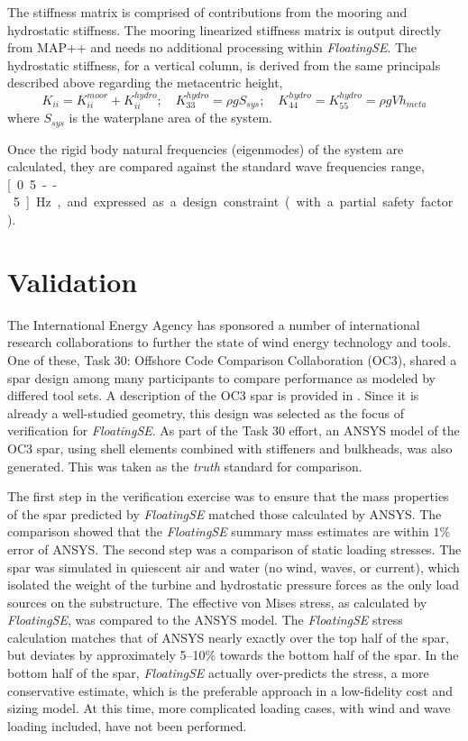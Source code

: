 The stiffness matrix is comprised of contributions from the mooring
and hydrostatic stiffness.  The mooring linearized stiffness matrix is output
directly from MAP++ and needs no additional processing within
\textit{FloatingSE}.  The hydrostatic stiffness, for a vertical column, is derived from the same
principals described above regarding the metacentric height,
\begin{equation}
  K_{ii} = K_{ii}^{moor} + K_{ii}^{hydro};\quad K_{33}^{hydro} = \rho g
  S_{sys};\quad K_{44}^{hydro} =  K_{55}^{hydro} = \rho g V h_{meta}
\end{equation}
where $S_{sys}$ is the waterplane area of the system.

Once the rigid body natural frequencies (eigenmodes) of the system are
calculated, they are compared against the standard wave frequencies
range, \unit[0.5--5]{Hz}, and expressed as a design constraint (with a
partial safety factor).


\section{Validation}
The International Energy Agency has sponsored a number of international
research collaborations to further the state of wind energy technology and
tools.  One of these, Task 30: Offshore Code Comparison Collaboration
(OC3), shared a spar design among many participants to compare
performance as modeled by differed tool sets.  A description of the OC3
spar is provided in \citet{OC3}.  Since it is already a
well-studied geometry, this design was selected as the focus of
verification for \textit{FloatingSE}.  As part of the Task 30 effort,
an ANSYS model of the OC3 spar, using shell elements combined with
stiffeners and bulkheads, was also generated.  This was taken as
the \textit{truth} standard for comparison.

The first step in the verification exercise was to ensure that the mass
properties of the spar predicted by \textit{FloatingSE} matched those
calculated by ANSYS.  The comparison showed that the \textit{FloatingSE}
summary mass estimates are within $1\%$ error of ANSYS.  The second step
was a comparison of static loading stresses.  The spar was simulated in
quiescent air and water (no wind, waves, or current), which isolated the
weight of the turbine and hydrostatic pressure forces as the only load
sources on the substructure.  The effective von Mises stress, as
calculated by \textit{FloatingSE}, was compared to the ANSYS model.  The
\textit{FloatingSE} stress calculation matches that of ANSYS nearly
exactly over the top half of the spar, but deviates by approximately
5--10\% towards the bottom half of the spar.  In the bottom half of the
spar, \textit{FloatingSE} actually over-predicts the stress, a more
conservative estimate, which is the preferable approach in a
low-fidelity cost and sizing model.  At this time, more complicated
loading cases, with wind and wave loading included, have not been
performed.

